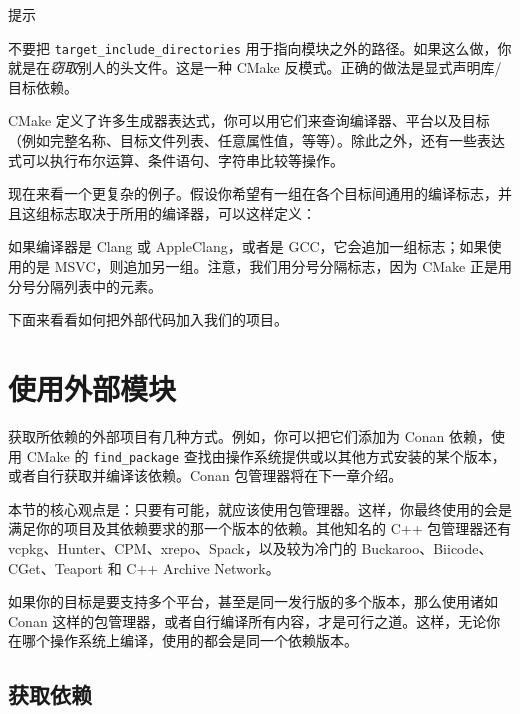 \begin{myTip}{提示}

不要把 \texttt{target\_\allowbreak{}include\_\allowbreak{}directories} 用于指向模块之外的路径。如果这么做，你就是在\emph{窃取}别人的头文件。这是一种 CMake 反模式。正确的做法是显式声明库/目标依赖。
\end{myTip}

CMake 定义了许多生成器表达式，你可以用它们来查询编译器、平台以及目标（例如完整名称、目标文件列表、任意属性值，等等）。除此之外，还有一些表达式可以执行布尔运算、条件语句、字符串比较等操作。

现在来看一个更复杂的例子。假设你希望有一组在各个目标间通用的编译标志，并且这组标志取决于所用的编译器，可以这样定义：


\label{idx:673}
如果编译器是 Clang 或 AppleClang，或者是 GCC，它会追加一组标志；如果使用的是 MSVC，则追加另一组。注意，我们用分号分隔标志，因为 CMake 正是用分号分隔列表中的元素。

下面来看看如何把外部代码加入我们的项目。

\section{使用外部模块}

\label{idx:674}
获取所依赖的外部项目有几种方式。例如，你可以把它们添加为 Conan 依赖，使用 CMake 的 \texttt{find\_\allowbreak{}package} 查找由操作系统提供或以其他方式安装的某个版本，或者自行获取并编译该依赖。Conan 包管理器将在下一章介绍。

本节的核心观点是：只要有可能，就应该使用包管理器。这样，你最终使用的会是满足你的项目及其依赖要求的那一个版本的依赖。其他知名的 C++ 包管理器还有 vcpkg、Hunter、CPM、xrepo、Spack，以及较为冷门的 Buckaroo、Biicode、CGet、Teaport 和 C++ Archive Network。

\label{idx:675}
如果你的目标是要支持多个平台，甚至是同一发行版的多个版本，那么使用诸如 Conan 这样的包管理器，或者自行编译所有内容，才是可行之道。这样，无论你在哪个操作系统上编译，使用的都会是同一个依赖版本。

\subsection{获取依赖}

